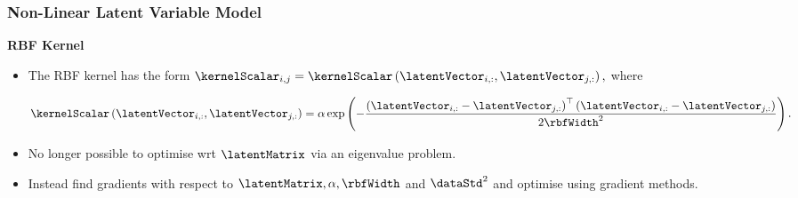 \begin{frame}
\begin{columns}[c]
    \begin{center}
      {\scriptsize {}}
      \par\end{center}{\scriptsize \par}

  \end{columns}%

\end{frame}

\begin{frame}
  \frametitle{Non-Linear Latent Variable Model}

  \textbf{RBF Kernel}
  \begin{itemize}
  \item The RBF kernel has the form $\kernelScalar_{i,j}=\kernelScalar\left(\latentVector_{i,:},\latentVector_{j,:}\right),$
    where


    \[
    \kernelScalar\left(\latentVector_{i,:},\latentVector_{j,:}\right)=\alpha\exp\left(-\frac{\left(\latentVector_{i,:}-\latentVector_{j,:}\right)^{\top}\left(\latentVector_{i,:}-\latentVector_{j,:}\right)}{2\rbfWidth^{2}}\right).\]


  \item No longer possible to optimise wrt $\latentMatrix$ via an eigenvalue
    problem.
  \item Instead find gradients with respect to $\latentMatrix,\alpha,\rbfWidth$
    and $\dataStd^{2}$ and optimise using gradient methods.
  \end{itemize}
  \begin{center}

    \par\end{center}





\end{frame}


